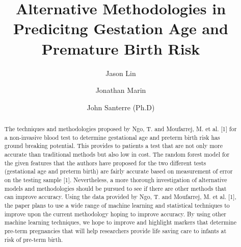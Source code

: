 \documentclass[]{llncs}
\begin{document}
%
\title{Alternative Methodologies in Predicitng Gestation Age and Premature Birth Risk}
%
%
\author{Jason Lin\and
Jonathan Marin\and
John Santerre (Ph.D)}
%
%
%
\maketitle              %
%
\begin{abstract}

The techniques and methodologies proposed by Ngo, T. and Moufarrej, M. et al. [1] for a non-invasive blood test to determine gestational age and preterm birth risk has ground breaking potential. This provides to patients a test that are not only more accurate than traditional methods but also low in cost. The random forest model for the given features that the authors have proposed for the two different tests (gestational age and preterm birth) are fairly accurate based on measurement of error on the testing sample [1]. Nevertheless, a more thorough investigation of alternative models and methodologies should be pursued to see if there are other methods that can improve accuracy. Using the data provided by Ngo, T. and Moufarrej, M. et al. [1], the paper plans to use a wide range of machine learning and statistical techniques to improve upon the current methodology hoping to improve accuracy. By using other machine learning techniques, we hope to improve and highlight markers that determine pre-term pregnancies that will help researchers provide life saving care to infants at risk of pre-term birth. 

\end{abstract}
%
%
%
\end{document}
